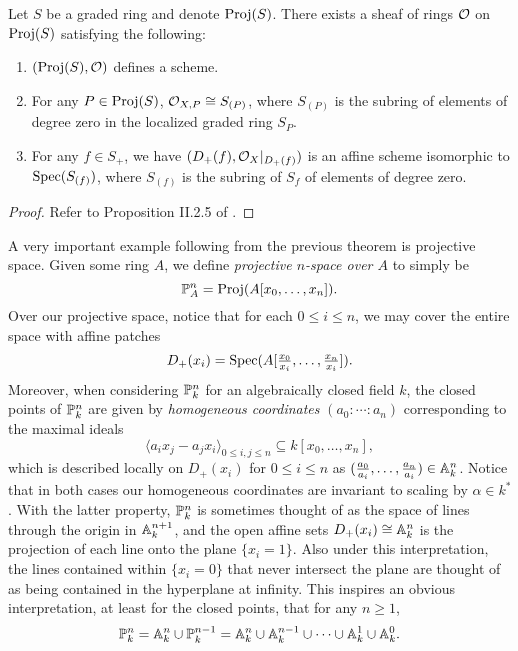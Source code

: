 \begin{theorem}
    Let $S$ be a graded ring and denote ${\rm Proj}(S)$.
    There exists a sheaf of rings $\mathcal{O}$ on ${\rm Proj}(S)$ satisfying the following:
    \begin{enumerate}
        \item $({\rm Proj}(S), \mathcal{O})$ defines a scheme.

        \item For any $P \in {\rm Proj}(S)$, $\mathcal{O}_{X, P} \cong S_{(P)}$,
        where $S_{(P)}$ is the subring of elements of degree zero in the localized graded ring $S_P$.

        \item For any $f \in S_+$, we have $(D_+(f), \mathcal{O}_X|_{D_+(f)})$ is an affine scheme isomorphic to ${\rm Spec}(S_{(f)})$,
        where $S_{(f)}$ is the subring of $S_f$ of elements of degree zero.
    \end{enumerate}
\end{theorem}
\begin{proof}
    Refer to Proposition II.2.5 of \cite{Hartshorne_2013}.
\end{proof}

A very important example following from the previous theorem is projective space.
Given some ring $A$, we define \textit{projective $n$-space over $A$} to simply be 
\[
    \mathbb{P}^n_A = {\rm Proj}(A[x_0, \ldots, x_n]).
\]
Over our projective space, notice that for each $0 \leq i \leq n$,
we may cover the entire space with affine patches
\[
    D_+(x_i) = {\rm Spec}(A[\tfrac{x_0}{x_i}, \ldots, \tfrac{x_n}{x_i}]).
\]
Moreover, when considering $\mathbb{P}^n_k$ for an algebraically closed field $k$,
the closed points of $\mathbb{P}^n_k$ are given by \textit{homogeneous coordinates} $(a_0 : \cdots : a_n)$ corresponding to the maximal ideals
\[
    \langle a_i x_j - a_j x_i \rangle_{0 \leq i, j \leq n} \subseteq k[x_0, \ldots, x_n],
\]
which is described locally on $D_+(x_i)$ for $0 \leq i \leq n$ as $(\tfrac{a_0}{a_i}, \ldots, \tfrac{a_n}{a_i}) \in \mathbb{A}_k^n$.
Notice that in both cases our homogeneous coordinates are invariant to scaling by $\alpha \in k^*$.
With the latter property, $\mathbb{P}_k^n$ is sometimes thought of as the space of lines through the origin in $\mathbb{A}_k^{n + 1}$,
and the open affine sets $D_+(x_i) \cong \mathbb{A}_k^n$ is the projection of each line onto the plane $\{ x_i = 1 \}$.
Also under this interpretation, 
the lines contained within $\{ x_i = 0 \}$ that never intersect the plane are thought of as being contained in the hyperplane at infinity.
This inspires an obvious interpretation,
at least for the closed points,
that for any $n \geq 1$,
\[
    \mathbb{P}_k^n = \mathbb{A}_k^n \cup \mathbb{P}_k^{n - 1} = \mathbb{A}_k^n \cup \mathbb{A}_k^{n - 1} \cup \cdots \cup \mathbb{A}_k^1 \cup \mathbb{A}_k^0.
\]

